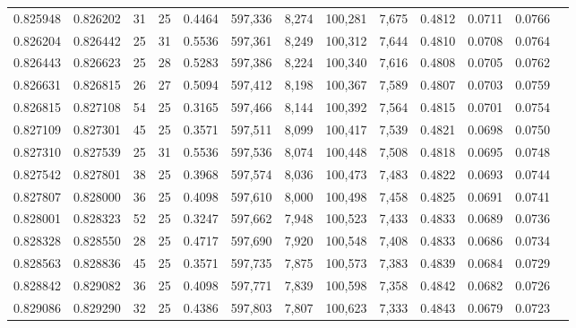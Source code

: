 \begin{tabular}{rrrrrrrrrrrrr}
0.825948 & 0.826202 &    31 &  25 &                                     0.4464 & 597,336 &   8,274 & 100,281 &   7,675 & 0.4812 & 0.0711 & 0.0766 \\
0.826204 & 0.826442 &    25 &  31 &                                     0.5536 & 597,361 &   8,249 & 100,312 &   7,644 & 0.4810 & 0.0708 & 0.0764 \\
0.826443 & 0.826623 &    25 &  28 &                                     0.5283 & 597,386 &   8,224 & 100,340 &   7,616 & 0.4808 & 0.0705 & 0.0762 \\
0.826631 & 0.826815 &    26 &  27 &                                     0.5094 & 597,412 &   8,198 & 100,367 &   7,589 & 0.4807 & 0.0703 & 0.0759 \\
0.826815 & 0.827108 &    54 &  25 &                                     0.3165 & 597,466 &   8,144 & 100,392 &   7,564 & 0.4815 & 0.0701 & 0.0754 \\
0.827109 & 0.827301 &    45 &  25 &                                     0.3571 & 597,511 &   8,099 & 100,417 &   7,539 & 0.4821 & 0.0698 & 0.0750 \\
0.827310 & 0.827539 &    25 &  31 &                                     0.5536 & 597,536 &   8,074 & 100,448 &   7,508 & 0.4818 & 0.0695 & 0.0748 \\
0.827542 & 0.827801 &    38 &  25 &                                     0.3968 & 597,574 &   8,036 & 100,473 &   7,483 & 0.4822 & 0.0693 & 0.0744 \\
0.827807 & 0.828000 &    36 &  25 &                                     0.4098 & 597,610 &   8,000 & 100,498 &   7,458 & 0.4825 & 0.0691 & 0.0741 \\
0.828001 & 0.828323 &    52 &  25 &                                     0.3247 & 597,662 &   7,948 & 100,523 &   7,433 & 0.4833 & 0.0689 & 0.0736 \\
0.828328 & 0.828550 &    28 &  25 &                                     0.4717 & 597,690 &   7,920 & 100,548 &   7,408 & 0.4833 & 0.0686 & 0.0734 \\
0.828563 & 0.828836 &    45 &  25 &                                     0.3571 & 597,735 &   7,875 & 100,573 &   7,383 & 0.4839 & 0.0684 & 0.0729 \\
0.828842 & 0.829082 &    36 &  25 &                                     0.4098 & 597,771 &   7,839 & 100,598 &   7,358 & 0.4842 & 0.0682 & 0.0726 \\
0.829086 & 0.829290 &    32 &  25 &                                     0.4386 & 597,803 &   7,807 & 100,623 &   7,333 & 0.4843 & 0.0679 & 0.0723 \\

\end{tabular}
